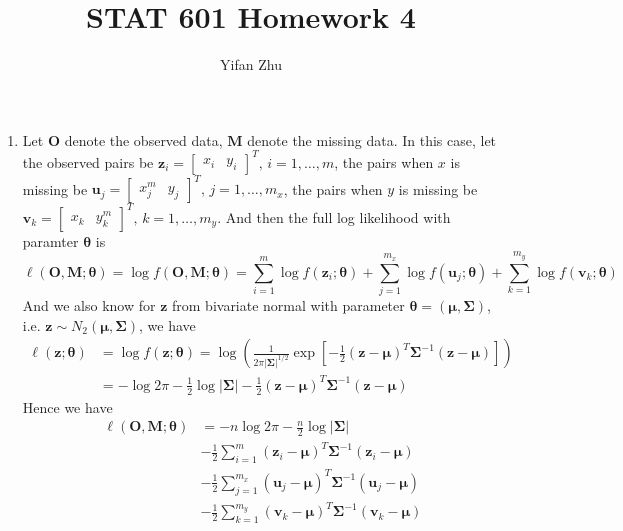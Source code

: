 \documentclass{article}
\begin{document}
	

	
	\title{STAT 601 Homework 4}
	\author{Yifan Zhu}
	\maketitle
	

\begin{enumerate}[font = \bfseries, leftmargin = 0 em]
	\item Let $\bm O$ denote the observed data, $\bm M$ denote the missing data. In this case, let the observed pairs be $\bm z_i = \begin{bmatrix}
		x_i & y_i
	\end{bmatrix}^T,\, i = 1, \ldots , m$, the pairs when $x$ is missing be $\bm u_j = \begin{bmatrix}
		x_j^m & y_j
	\end{bmatrix}^T,\, j = 1, \ldots, m_x$, the pairs when $y$ is missing be $\bm v_k = \begin{bmatrix}
		x_k & y_k^m
	\end{bmatrix}^T,\, k = 1, \ldots , m_y$. And then the full log likelihood with paramter $\bm \theta$ is
	\[\ell(\bm O, \bm M; \bm \theta) = \log f(\bm O, \bm M; \bm \theta) = \sum_{i = 1}^m \log f(\bm z_i; \bm \theta) + \sum_{j = 1}^{m_x} \log f(\bm u_j; \bm \theta) + \sum_{k=1}^{m_y} \log f(\bm v_k; \bm \theta)\]
	And we also know for $\bm z$ from bivariate normal with parameter $\bm \theta = (\bm \mu, \bm \Sigma)$, i.e. $\bm z \sim N_2 (\bm \mu, \bm \Sigma)$, we have
	\begin{align*}
	\ell(\bm z; \bm \theta) &= \log f(\bm z; \bm \theta) = \log \left(\frac{1}{2 \pi |\bm \Sigma|^{1/2}} \exp\left[-\frac{1}{2}(\bm z - \bm \mu)^T\bm \Sigma^{-1}(\bm z - \bm \mu)\right]\right)\\
	& = -\log 2 \pi -\frac{1}{2} \log|\bm \Sigma| - \frac{1}{2} (\bm z - \bm \mu)^T\bm \Sigma^{-1}(\bm z - \bm \mu)\end{align*}
	Hence we have 
	\begin{align*}
	\ell(\bm O, \bm M; \bm \theta) &= -n\log 2 \pi - \frac{n}{2} \log |\bm \Sigma| \\
	&- \frac{1}{2} \sum_{i=1}^m (\bm z_i - \bm \mu)^T\bm \Sigma^{-1}(\bm z_i - \bm \mu) \\
	&- \frac{1}{2} \sum_{j=1}^{m_x} (\bm u_j - \bm \mu)^T\bm \Sigma^{-1}(\bm u_j - \bm \mu)\\
	& - \frac{1}{2} \sum_{k=1}^{m_y} (\bm v_k - \bm \mu)^T\bm \Sigma^{-1}(\bm v_k - \bm \mu)
	\end{align*}


\end{enumerate}
\end{document}
